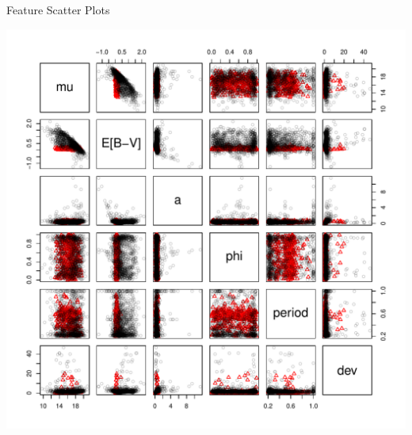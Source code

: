 \documentclass[12pt]{beamer}
\begin{document}
\begin{frame}{Feature Scatter Plots}
  \begin{center}
    \includegraphics[scale=0.45]{figs/RRfeatures.pdf}
  \end{center}
\end{frame}
\end{document}
